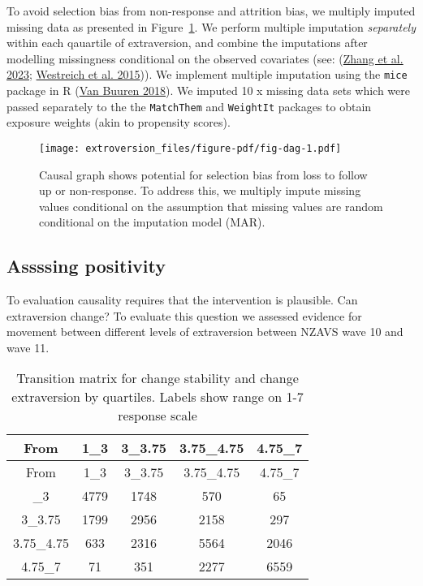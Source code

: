\documentclass[
  singlecolumn]{report}
\begin{document}
To avoid selection bias from non-response and attrition bias, we
multiply imputed missing data as presented in Figure~\ref{fig-dag}. We
perform multiple imputation \emph{separately} within each qauartile of
extraversion, and combine the imputations after modelling missingness
conditional on the observed covariates (see:
(\protect\hyperlink{ref-zhang2023}{Zhang et al. 2023};
\protect\hyperlink{ref-westreich2015}{Westreich et al. 2015})). We
implement multiple imputation using the \texttt{mice} package in R
(\protect\hyperlink{ref-vanbuuren2018}{Van Buuren 2018}). We imputed 10
x missing data sets which were passed separately to the the
\texttt{MatchThem} and \texttt{WeightIt} packages to obtain exposure
weights (akin to propensity scores).

\begin{figure}

{\centering \texttt{[image: extroversion\_files/figure-pdf/fig-dag-1.pdf]}

}

\caption{\label{fig-dag}Causal graph shows potential for selection bias
from loss to follow up or non-response. To address this, we multiply
impute missing values conditional on the assumption that missing values
are random conditional on the imputation model (MAR).}

\end{figure}

\hypertarget{assssing-positivity}{%
\subsection{Assssing positivity}\label{assssing-positivity}}

To evaluation causality requires that the intervention is plausible. Can
extraversion change? To evaluate this question we assessed evidence for
movement between different levels of extraversion between NZAVS wave 10
and wave 11.

\hypertarget{tbl-transition-factor}{}
\begin{longtable}[]{@{}ccccc@{}}
\caption{\label{tbl-transition-factor}Transition matrix for change
stability and change extraversion by quartiles. Labels show range on 1-7
response scale}\tabularnewline
\toprule\noalign{}
From & 1\_3 & 3\_3.75 & 3.75\_4.75 & 4.75\_7 \\
\midrule\noalign{}
\endfirsthead
\toprule\noalign{}
From & 1\_3 & 3\_3.75 & 3.75\_4.75 & 4.75\_7 \\
\midrule\noalign{}
\endhead
\bottomrule\noalign{}
\endlastfoot
1\_3 & 4779 & 1748 & 570 & 65 \\
3\_3.75 & 1799 & 2956 & 2158 & 297 \\
3.75\_4.75 & 633 & 2316 & 5564 & 2046 \\
4.75\_7 & 71 & 351 & 2277 & 6559 \\
\end{longtable}
\end{document}
